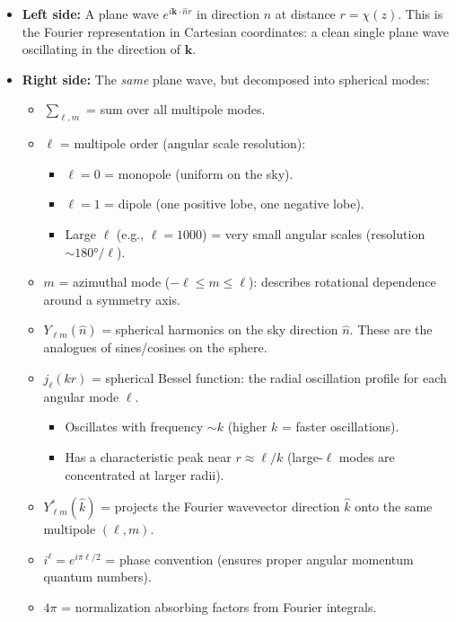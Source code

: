 \begin{itemize}[leftmargin=1.5cm]
    \item \textbf{Left side:} A plane wave $e^{i\mathbf{k} \cdot \hat{n} r}$ in direction $\hat{n}$ at distance $r = \chi(z)$. This is the Fourier representation in Cartesian coordinates: a clean single plane wave oscillating in the direction of $\mathbf{k}$.
    
    \item \textbf{Right side:} The \emph{same} plane wave, but decomposed into spherical modes:
        \begin{itemize}
            \item $\sum_{\ell, m}$ = sum over all multipole modes.
            \item $\ell$ = multipole order (angular scale resolution):
                \begin{itemize}
                    \item $\ell = 0$ = monopole (uniform on the sky).
                    \item $\ell = 1$ = dipole (one positive lobe, one negative lobe).
                    \item Large $\ell$ (e.g., $\ell = 1000$) = very small angular scales (resolution $\sim 180°/\ell$).
                \end{itemize}
            \item $m$ = azimuthal mode ($-\ell \leq m \leq \ell$): describes rotational dependence around a symmetry axis.
            \item $Y_{\ell m}(\hat{n})$ = spherical harmonics on the sky direction $\hat{n}$. These are the analogues of sines/cosines on the sphere.
            \item $j_\ell(kr)$ = spherical Bessel function: the radial oscillation profile for each angular mode $\ell$.
                \begin{itemize}
                    \item Oscillates with frequency $\sim k$ (higher $k$ = faster oscillations).
                    \item Has a characteristic peak near $r \approx \ell / k$ (large-$\ell$ modes are concentrated at larger radii).
                \end{itemize}
            \item $Y^*_{\ell m}(\hat{k})$ = projects the Fourier wavevector direction $\hat{k}$ onto the same multipole $(\ell, m)$.
            \item $i^\ell = e^{i\pi \ell/2}$ = phase convention (ensures proper angular momentum quantum numbers).
            \item $4\pi$ = normalization absorbing factors from Fourier integrals.
        \end{itemize}
    

\end{itemize}
